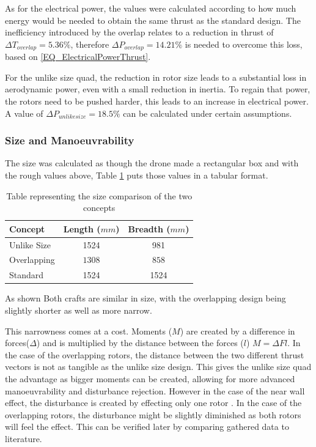 As for the electrical power, the values were calculated according to how much energy would be needed to obtain the same thrust as the standard design. The inefficiency introduced by the overlap relates to a reduction in thrust of $\Delta T_{overlap} = 5.36\%$, therefore $\Delta P_{overlap} = 14.21\%$ is needed to overcome this loss, based on \eqref{EQ_ElectricalPowerThrust}. 

For the unlike size quad, the reduction in rotor size leads to a substantial loss in aerodynamic power, even with a small reduction in inertia. To regain that power, the rotors need to be pushed harder, this leads to an increase in electrical power. A value of $\Delta P_{unlike size} = 18.5\%$ can be calculated under certain assumptions.

\subsubsection{Size and Manoeuvrability}
The size was calculated as though the drone made a rectangular box and with the rough values above, Table \ref{TAB_SizeComparison} puts those values in a tabular format.

\begin{table}[H]
	\centering
	\begin{tabular}{l | c | c }
		Concept & Length ($mm$) & Breadth ($mm$) \\
		\hline\hline
		Unlike Size	   	& 1524 & 981 \\
		Overlapping    & \boldmath$1308$ & \boldmath$858$ \\
		Standard		& 1524 & 1524\\
	\end{tabular}
	\label{TAB_SizeComparison}
	\caption{Table representing the size comparison of the two concepts}
\end{table}

As shown Both crafts are similar in size, with the overlapping design being slightly shorter as well as more narrow. 

This narrowness comes at a cost. Moments ($M$) are created by a difference in forces($\Delta$) and is multiplied by the distance between the forces ($l$) $M = \Delta Fl $. In the case of the overlapping rotors, the distance between the two different thrust vectors is not as tangible as the unlike size design. This gives the unlike size quad the advantage as bigger moments can be created, allowing for more advanced manoeuvrability and disturbance rejection. However in the case of the near wall effect, the disturbance is created by effecting only one rotor . In the case of the overlapping rotors, the disturbance might be slightly diminished as both rotors will feel the effect. This can be verified later by comparing gathered data to literature. 


